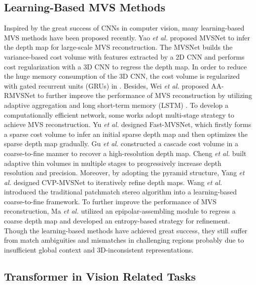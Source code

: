 \documentclass[10pt,twocolumn,letterpaper]{article}
\begin{document}
\subsection{Learning-Based MVS Methods}

Inspired by the great success of CNNs in computer vision, many learning-based MVS methods have been proposed recently. Yao \textit{et al.} \cite{mvsnet} proposed MVSNet to infer the depth map for large-scale MVS reconstruction. The MVSNet builds the variance-based cost volume with features extracted by a 2D CNN and performs cost regularization with a 3D CNN to regress the depth map. In order to reduce the huge memory consumption of the 3D CNN, the cost volume is regularized with gated recurrent units (GRUs) \cite{gru} in \cite{rmvsnet}. Besides, Wei \textit{et al.} \cite{aarmvsnet} proposed AA-RMVSNet to further improve the performance of MVS reconstruction by utilizing adaptive aggregation and long short-term memory (LSTM) \cite{lstm}. To develop a computationally efficient network, some works adopt multi-stage strategy to achieve MVS reconstruction. Yu \textit{et al.} \cite{fastmvsnet} designed Fast-MVSNet, which firstly forms a sparse cost volume to infer an initial sparse depth map and then optimizes the sparse depth map gradually. Gu \textit{et al.} \cite{casmvsnet} constructed a cascade cost volume in a coarse-to-fine manner to recover a high-resolution depth map. Cheng \textit{et al.} \cite{ucsnet} built adaptive thin volumes in multiple stages to progressively increase depth resolution and precision.  Moreover, by adopting the pyramid structure, Yang \textit{et al.} \cite{cvpmvsnet} designed CVP-MVSNet to iteratively refine depth maps. Wang \textit{et al.} \cite{patchmatchnet} introduced the traditional patchmatch stereo algorithm \cite{patchmatchstereo} into a learning-based coarse-to-fine framework. To further improve the performance of MVS reconstruction, Ma \textit{et al.} \cite{eppmvsnet} utilized an epipolar-assembling module to regress a coarse depth map and developed an entropy-based strategy for refinement. Though the learning-based methods have achieved great success, they still suffer from match ambiguities and mismatches in challenging regions probably due to insufficient global context and 3D-inconsistent representations. 

\subsection{Transformer in Vision Related Tasks}
\end{document}
